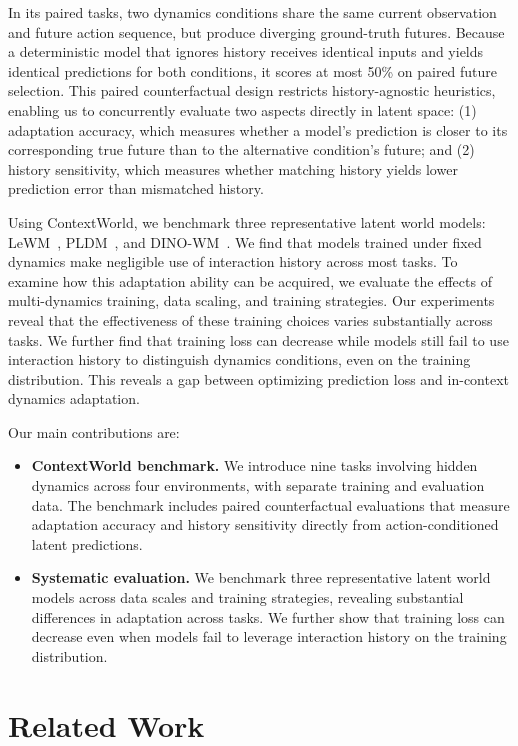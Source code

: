 In its paired tasks, two dynamics conditions share the same current observation and future action sequence, but produce diverging ground-truth futures.
Because a deterministic model that ignores history receives identical inputs and yields identical predictions for both conditions, it scores at most 50\% on paired future selection.
This paired counterfactual design restricts history-agnostic heuristics, enabling us to concurrently evaluate two aspects directly in latent space: (1) adaptation accuracy, which measures whether a model's prediction is closer to its corresponding true future than to the alternative condition's future; and (2) history sensitivity, which measures whether matching history yields lower prediction error than mismatched history.

Using ContextWorld, we benchmark three representative latent world models: LeWM~\cite{maes2026leworldmodel}, PLDM~\cite{sobal2025pldm}, and DINO-WM~\cite{zhou2025dinowm}.
We find that models trained under fixed dynamics make negligible use of interaction history across most tasks.
To examine how this adaptation ability can be acquired, we evaluate the effects of multi-dynamics training, data scaling, and training strategies.
Our experiments reveal that the effectiveness of these training choices varies substantially across tasks.
We further find that training loss can decrease while models still fail to use interaction history to distinguish dynamics conditions, even on the training distribution.
This reveals a gap between optimizing prediction loss and in-context dynamics adaptation.

Our main contributions are:
\begin{itemize}
\item \textbf{ContextWorld benchmark.} We introduce nine tasks involving hidden dynamics across four environments, with separate training and evaluation data. The benchmark includes paired counterfactual evaluations that measure adaptation accuracy and history sensitivity directly from action-conditioned latent predictions.
\item \textbf{Systematic evaluation.} We benchmark three representative latent world models across data scales and training strategies, revealing substantial differences in adaptation across tasks. We further show that training loss can decrease even when models fail to leverage interaction history on the training distribution.
\end{itemize}

\section{Related Work}
\label{sec:related-work}

